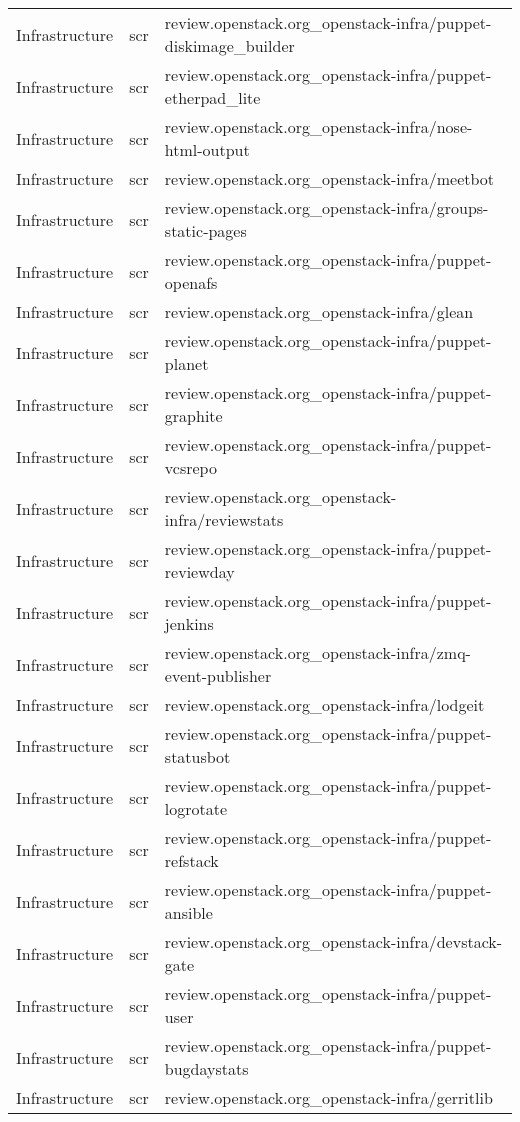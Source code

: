 \begin{center}
\begin{longtable}{|p{4cm}|p{1cm}|p{10cm}|}
Infrastructure&scr&review.openstack.org\_openstack-infra/puppet-diskimage\_builder\\ 
Infrastructure&scr&review.openstack.org\_openstack-infra/puppet-etherpad\_lite\\ 
Infrastructure&scr&review.openstack.org\_openstack-infra/nose-html-output\\ 
Infrastructure&scr&review.openstack.org\_openstack-infra/meetbot\\ 
Infrastructure&scr&review.openstack.org\_openstack-infra/groups-static-pages\\ 
Infrastructure&scr&review.openstack.org\_openstack-infra/puppet-openafs\\ 
Infrastructure&scr&review.openstack.org\_openstack-infra/glean\\ 
Infrastructure&scr&review.openstack.org\_openstack-infra/puppet-planet\\ 
Infrastructure&scr&review.openstack.org\_openstack-infra/puppet-graphite\\ 
Infrastructure&scr&review.openstack.org\_openstack-infra/puppet-vcsrepo\\ 
Infrastructure&scr&review.openstack.org\_openstack-infra/reviewstats\\ 
Infrastructure&scr&review.openstack.org\_openstack-infra/puppet-reviewday\\ 
Infrastructure&scr&review.openstack.org\_openstack-infra/puppet-jenkins\\ 
Infrastructure&scr&review.openstack.org\_openstack-infra/zmq-event-publisher\\ 
Infrastructure&scr&review.openstack.org\_openstack-infra/lodgeit\\ 
Infrastructure&scr&review.openstack.org\_openstack-infra/puppet-statusbot\\ 
Infrastructure&scr&review.openstack.org\_openstack-infra/puppet-logrotate\\ 
Infrastructure&scr&review.openstack.org\_openstack-infra/puppet-refstack\\ 
Infrastructure&scr&review.openstack.org\_openstack-infra/puppet-ansible\\ 
Infrastructure&scr&review.openstack.org\_openstack-infra/devstack-gate\\ 
Infrastructure&scr&review.openstack.org\_openstack-infra/puppet-user\\ 
Infrastructure&scr&review.openstack.org\_openstack-infra/puppet-bugdaystats\\ 
Infrastructure&scr&review.openstack.org\_openstack-infra/gerritlib\\ 

\end{longtable}
\end{center}
